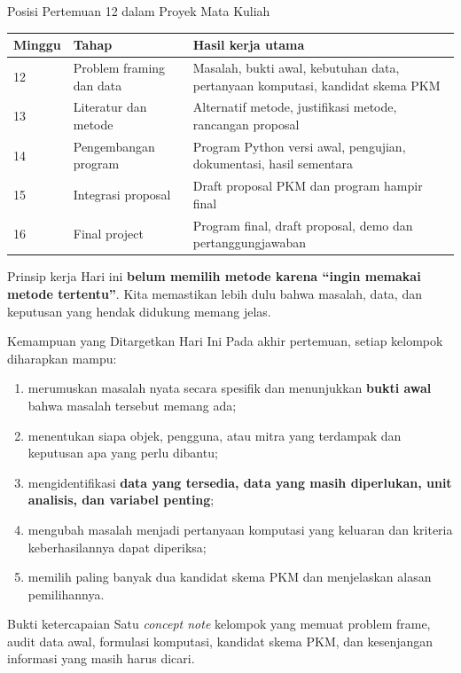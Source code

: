 \documentclass[aspectratio=169,11pt]{beamer}
\begin{document}
\begin{frame}{Posisi Pertemuan 12 dalam Proyek Mata Kuliah}
\small
\begin{center}
\begin{tabular}{p{1.4cm} p{3.7cm} p{7.9cm}}
\toprule
\textbf{Minggu} & \textbf{Tahap} & \textbf{Hasil kerja utama} \\
\midrule
12 & Problem framing dan data & Masalah, bukti awal, kebutuhan data, pertanyaan komputasi, kandidat skema PKM \\
13 & Literatur dan metode & Alternatif metode, justifikasi metode, rancangan proposal \\
14 & Pengembangan program & Program Python versi awal, pengujian, dokumentasi, hasil sementara \\
15 & Integrasi proposal & Draft proposal PKM dan program hampir final \\
16 & Final project & Program final, draft proposal, demo dan pertanggungjawaban \\
\bottomrule
\end{tabular}
\end{center}

\begin{alertblock}{Prinsip kerja}
\small
Hari ini \textbf{belum memilih metode karena ``ingin memakai metode tertentu''}. Kita memastikan lebih dulu bahwa masalah, data, dan keputusan yang hendak didukung memang jelas.
\end{alertblock}
\end{frame}

\begin{frame}{Kemampuan yang Ditargetkan Hari Ini}
\small
Pada akhir pertemuan, setiap kelompok diharapkan mampu:
\begin{enumerate}
  \item merumuskan masalah nyata secara spesifik dan menunjukkan \textbf{bukti awal} bahwa masalah tersebut memang ada;
  \item menentukan siapa objek, pengguna, atau mitra yang terdampak dan keputusan apa yang perlu dibantu;
  \item mengidentifikasi \textbf{data yang tersedia, data yang masih diperlukan, unit analisis, dan variabel penting};
  \item mengubah masalah menjadi pertanyaan komputasi yang keluaran dan kriteria keberhasilannya dapat diperiksa;
  \item memilih paling banyak dua kandidat skema PKM dan menjelaskan alasan pemilihannya.
\end{enumerate}

\begin{block}{Bukti ketercapaian}
\footnotesize
Satu \textit{concept note} kelompok yang memuat problem frame, audit data awal, formulasi komputasi, kandidat skema PKM, dan kesenjangan informasi yang masih harus dicari.
\end{block}
\end{frame}
\end{document}
